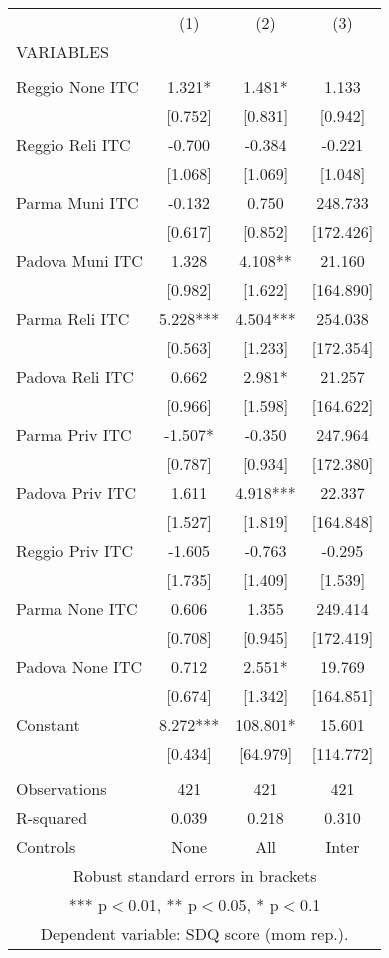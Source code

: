 \begin{tabular}{lccc} \hline
 & (1) & (2) & (3) \\
VARIABLES &  &  &  \\ \hline
 &  &  &  \\
Reggio None ITC & 1.321* & 1.481* & 1.133 \\
 & [0.752] & [0.831] & [0.942] \\
Reggio Reli ITC & -0.700 & -0.384 & -0.221 \\
 & [1.068] & [1.069] & [1.048] \\
Parma Muni ITC & -0.132 & 0.750 & 248.733 \\
 & [0.617] & [0.852] & [172.426] \\
Padova Muni ITC & 1.328 & 4.108** & 21.160 \\
 & [0.982] & [1.622] & [164.890] \\
Parma Reli ITC & 5.228*** & 4.504*** & 254.038 \\
 & [0.563] & [1.233] & [172.354] \\
Padova Reli ITC & 0.662 & 2.981* & 21.257 \\
 & [0.966] & [1.598] & [164.622] \\
Parma Priv ITC & -1.507* & -0.350 & 247.964 \\
 & [0.787] & [0.934] & [172.380] \\
Padova Priv ITC & 1.611 & 4.918*** & 22.337 \\
 & [1.527] & [1.819] & [164.848] \\
Reggio Priv ITC & -1.605 & -0.763 & -0.295 \\
 & [1.735] & [1.409] & [1.539] \\
Parma None ITC & 0.606 & 1.355 & 249.414 \\
 & [0.708] & [0.945] & [172.419] \\
Padova None ITC & 0.712 & 2.551* & 19.769 \\
 & [0.674] & [1.342] & [164.851] \\
Constant & 8.272*** & 108.801* & 15.601 \\
 & [0.434] & [64.979] & [114.772] \\
 &  &  &  \\
Observations & 421 & 421 & 421 \\
R-squared & 0.039 & 0.218 & 0.310 \\
 Controls & None & All & Inter \\ \hline
\multicolumn{4}{c}{ Robust standard errors in brackets} \\
\multicolumn{4}{c}{ *** p$<$0.01, ** p$<$0.05, * p$<$0.1} \\
\multicolumn{4}{c}{ Dependent variable: SDQ score (mom rep.).} \\
\end{tabular}
